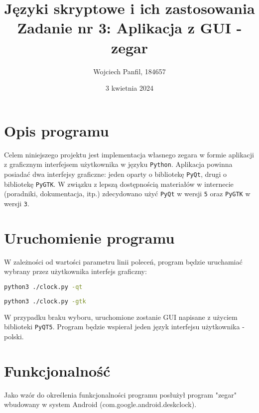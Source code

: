 \documentclass[11pt]{article}
\title{
	\textbf{Języki skryptowe i ich zastosowania}\\
	Zadanie nr 3: Aplikacja z GUI - zegar}
\author{Wojciech Panfil, 184657}
\date{3 kwietnia 2024}
\begin{document}
	\maketitle
	
    \section{Opis programu}
	\justify
	Celem niniejszego projektu jest implementacja własnego zegara w formie
    aplikacji z graficznym interfejsem użytkownika w języku \texttt{Python}. Aplikacja powinna posiadać
    dwa interfejsy graficzne: jeden oparty o bibliotekę \texttt{PyQt}, drugi o bibliotekę \texttt{PyGTK}.
    W związku z lepszą dostępnością materiałów w internecie (poradniki, dokumentacja, itp.) zdecydowano użyć \texttt{PyQt} w wersji \texttt{5} 
    oraz \texttt{PyGTK} w wersji \texttt{3}.

    \section{Uruchomienie programu}
    W zależności od wartości parametru linii poleceń, program będzie uruchamiać wybrany przez użytkownika interfejs graficzny:
    \begin{lstlisting}[language=bash, caption={Uruchomienie programu z GUI opartym o bibliotekę \texttt{PyQT5}},captionpos=b]
    python3 ./clock.py -qt
    \end{lstlisting}
    \begin{lstlisting}[language=bash, caption={Uruchomienie programu z GUI opartym o bibliotekę \texttt{PyGTK3}},captionpos=b]
    python3 ./clock.py -gtk
    \end{lstlisting}
    W przypadku braku wyboru, uruchomione zostanie GUI napisane z użyciem biblioteki \texttt{PyQT5}.
    Program będzie wspierał jeden język interfejsu użytkownika - polski.

    \section{Funkcjonalność}
    Jako wzór do określenia funkcjonalności programu posłużył program "zegar" wbudowany
    w system Android (com.google.android.deskclock).
\end{document}

